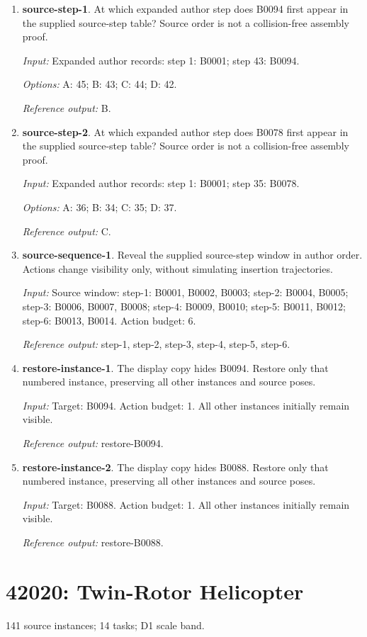 \begin{enumerate}
\item \textbf{source-step-1}. At which expanded author step does B0094 first appear in the supplied source-step table? Source order is not a collision-free assembly proof.\par {\small \textit{Input:} Expanded author records: step 1: B0001; step 43: B0094. \par\textit{Options:} A: 45; B: 43; C: 44; D: 42. \par\textit{Reference output:} B.}
\item \textbf{source-step-2}. At which expanded author step does B0078 first appear in the supplied source-step table? Source order is not a collision-free assembly proof.\par {\small \textit{Input:} Expanded author records: step 1: B0001; step 35: B0078. \par\textit{Options:} A: 36; B: 34; C: 35; D: 37. \par\textit{Reference output:} C.}
\item \textbf{source-sequence-1}. Reveal the supplied source-step window in author order. Actions change visibility only, without simulating insertion trajectories.\par {\small \textit{Input:} Source window: step-1: B0001, B0002, B0003; step-2: B0004, B0005; step-3: B0006, B0007, B0008; step-4: B0009, B0010; step-5: B0011, B0012; step-6: B0013, B0014. Action budget: 6. \par\textit{Reference output:} step-1, step-2, step-3, step-4, step-5, step-6.}
\item \textbf{restore-instance-1}. The display copy hides B0094. Restore only that numbered instance, preserving all other instances and source poses.\par {\small \textit{Input:} Target: B0094. Action budget: 1. All other instances initially remain visible. \par\textit{Reference output:} restore-B0094.}
\item \textbf{restore-instance-2}. The display copy hides B0088. Restore only that numbered instance, preserving all other instances and source poses.\par {\small \textit{Input:} Target: B0088. Action budget: 1. All other instances initially remain visible. \par\textit{Reference output:} restore-B0088.}
\end{enumerate}
\clearpage
\section{42020: Twin-Rotor Helicopter}
141 source instances; 14 tasks; D1 scale band.

